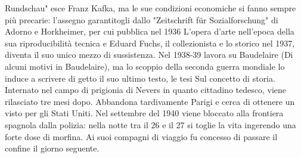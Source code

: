 Rundschau" esce Franz Kafka, ma le sue condizioni economiche si fanno sempre più precarie: l'assegno garantitogli dallo "Zeitschrift für Sozialforschung" di Adorno e Horkheimer, per cui pubblica nel 1936 L'opera d'arte nell'epoca della sua riproducibilità tecnica e Eduard Fuchs, il collezionista e lo storico nel 1937, diventa il suo unico mezzo di sussistenza. Nel 1938-39 lavora su Baudelaire (Di alcuni motivi in Baudelaire), ma lo scoppio della seconda guerra mondiale lo induce a scrivere di getto il suo ultimo testo, le tesi Sul concetto di storia. Internato nel campo di prigionia di Nevers in quanto cittadino tedesco, viene rilasciato tre mesi dopo. Abbandona tardivamente Parigi e cerca di ottenere un visto per gli Stati Uniti. Nel settembre del 1940 viene bloccato alla frontiera spagnola dalla polizia: nella notte tra il 26 e il 27 si toglie la vita ingerendo una forte dose di morfina. Ai suoi compagni di viaggio fu concesso di passare il confine il giorno seguente.
